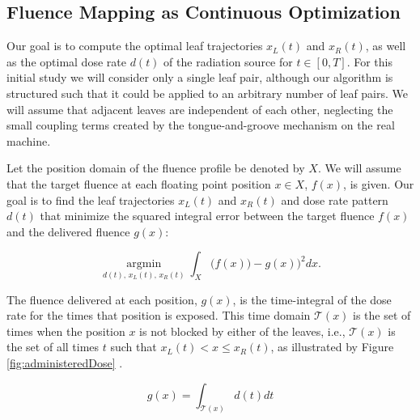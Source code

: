 \subsection{Fluence Mapping as Continuous Optimization}
\label{sec:FluenceMappingAsContinuousOptimization}

Our goal is to compute the optimal leaf trajectories $x_L(t)$ and $x_R(t)$,
as well as the optimal dose rate $d(t)$ of the radiation source for $t\in[0,T]$.
For this initial study we will consider only a single leaf pair,
although our algorithm is structured such that it could be applied to an arbitrary number of leaf pairs.
We will assume that adjacent leaves are independent of each other,
neglecting the small coupling terms created by the tongue-and-groove mechanism on the real machine.

Let the position domain of the fluence profile be denoted by $X$.
We will assume that the target fluence at each floating point position $x\in X$, $f(x)$, is given.
Our goal is to find the leaf trajectories $x_L(t)$ and $x_R(t)$ and dose rate pattern $d(t)$
that minimize the squared integral error between the target fluence $f(x)$ and the delivered fluence $g(x)$:

\begin{equation}
\underset{d(t), \, x_L(t), \, x_R(t)}{\operatorname{argmin}}
\int_X \bigg(f(x)) - g(x)\bigg)^2 dx .
\label{eqn:fluenceMapOptimization}
\end{equation}

\vspace{6pt}


The fluence delivered at each position, $g(x)$, is the time-integral of the dose rate for the times that position is exposed.
This time domain $\mathcal{T}(x)$ is the set of times when the position $x$ is not blocked by either of the leaves, i.e.,
$\mathcal{T}(x)$ is the set of all times $t$ such that $x_L(t) < x \leq x_R(t)$,
as illustrated by Figure \ref{fig:administeredDose} .

\begin{equation}
g(x) = \int_{\mathcal{T}(x)} d(t) dt
\label{eqn:deliveredFluenceDose}
\end{equation}



